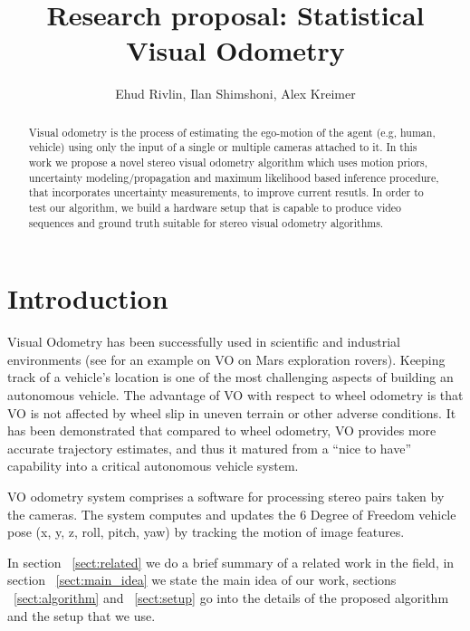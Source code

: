 \documentclass[10pt]{article}         %
\title{Research proposal: Statistical Visual Odometry}
\author{Ehud Rivlin, Ilan Shimshoni, Alex Kreimer}
\begin{document}
\maketitle

\begin{abstract}
Visual odometry is the process of estimating the ego-motion of the agent (e.g, human, vehicle) using only the input of a single or multiple cameras attached to it.  In this work we propose a novel stereo visual odometry algorithm which uses motion priors, uncertainty modeling/propagation and maximum likelihood based inference procedure, that incorporates uncertainty measurements, to improve current resutls.  In order to test our algorithm, we build a hardware setup that is capable to produce video sequences and ground truth suitable for stereo visual odometry algorithms.
\end{abstract}
\section{Introduction}

Visual Odometry has been successfully used in scientific and industrial environments (see \cite{Maimone07twoyears} for an example on VO on Mars exploration rovers). Keeping track of a vehicle's location is one of the most challenging aspects of building an autonomous vehicle.  The advantage of VO with respect to wheel odometry is that VO is not affected by wheel slip in uneven terrain or other adverse conditions.  It has been demonstrated that compared to wheel odometry, VO provides more accurate trajectory estimates, and thus it matured from a ``nice to have'' capability into a critical autonomous vehicle system.

VO odometry system comprises a software for processing stereo pairs taken by the cameras.  The system computes and updates the 6 Degree of Freedom vehicle pose (x, y, z, roll, pitch, yaw) by tracking the motion of image features.

In section ~\ref{sect:related} we do a brief summary of a related work in the field, in section ~\ref{sect:main_idea} we state the main idea of our work, sections ~\ref{sect:algorithm} and ~\ref{sect:setup} go into the details of the proposed algorithm and the setup that we use.
\end{document}

